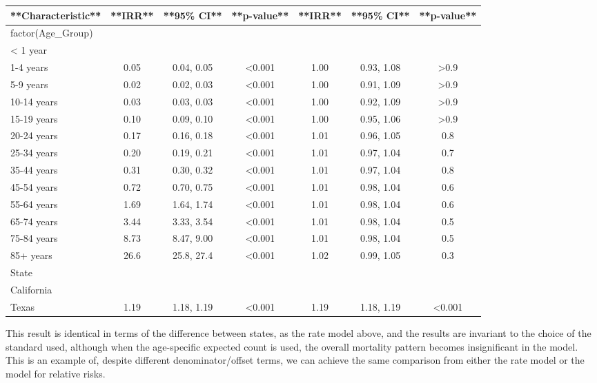 \documentclass[
]{article}
\begin{document}
\begin{tabular}{l|c|c|c|c|c|c}
\hline
**Characteristic** & **IRR** & **95\% CI** & **p-value** & **IRR** & **95\% CI** & **p-value**\\
\hline
factor(Age\_Group) &  &  &  &  &  & \\
\hline
< 1 year &  &  &  &  &  & \\
\hline
1-4 years & 0.05 & 0.04, 0.05 & <0.001 & 1.00 & 0.93, 1.08 & >0.9\\
\hline
5-9 years & 0.02 & 0.02, 0.03 & <0.001 & 1.00 & 0.91, 1.09 & >0.9\\
\hline
10-14 years & 0.03 & 0.03, 0.03 & <0.001 & 1.00 & 0.92, 1.09 & >0.9\\
\hline
15-19 years & 0.10 & 0.09, 0.10 & <0.001 & 1.00 & 0.95, 1.06 & >0.9\\
\hline
20-24 years & 0.17 & 0.16, 0.18 & <0.001 & 1.01 & 0.96, 1.05 & 0.8\\
\hline
25-34 years & 0.20 & 0.19, 0.21 & <0.001 & 1.01 & 0.97, 1.04 & 0.7\\
\hline
35-44 years & 0.31 & 0.30, 0.32 & <0.001 & 1.01 & 0.97, 1.04 & 0.8\\
\hline
45-54 years & 0.72 & 0.70, 0.75 & <0.001 & 1.01 & 0.98, 1.04 & 0.6\\
\hline
55-64 years & 1.69 & 1.64, 1.74 & <0.001 & 1.01 & 0.98, 1.04 & 0.6\\
\hline
65-74 years & 3.44 & 3.33, 3.54 & <0.001 & 1.01 & 0.98, 1.04 & 0.5\\
\hline
75-84 years & 8.73 & 8.47, 9.00 & <0.001 & 1.01 & 0.98, 1.04 & 0.5\\
\hline
85+ years & 26.6 & 25.8, 27.4 & <0.001 & 1.02 & 0.99, 1.05 & 0.3\\
\hline
State &  &  &  &  &  & \\
\hline
California &  &  &  &  &  & \\
\hline
Texas & 1.19 & 1.18, 1.19 & <0.001 & 1.19 & 1.18, 1.19 & <0.001\\
\hline
\end{tabular}

This result is identical in terms of the difference between states, as the rate model above, and the results are invariant to the choice of the standard used, although when the age-specific expected count is used, the overall mortality pattern becomes insignificant in the model. This is an example of, despite different denominator/offset terms, we can achieve the same comparison from either the rate model or the model for relative risks.
\end{document}

